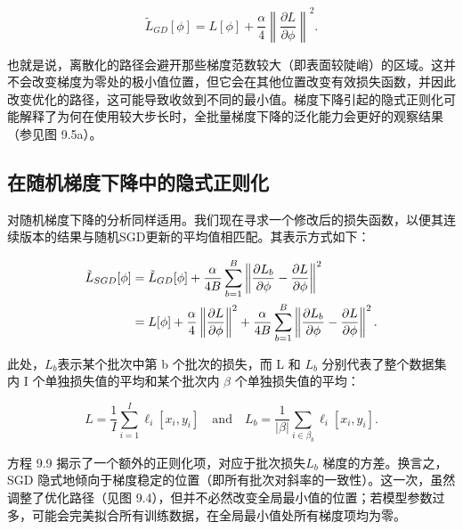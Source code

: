 \documentclass[lang=cn,newtx,10pt,scheme=chinese]{elegantbook}
\begin{document}
\begin{equation}
\tilde{L}_{GD}[\phi] = L[\phi] + \frac{\alpha}{4} \left\| \frac{\partial L}{\partial \phi} \right\|^2 . 
\end{equation}

也就是说，离散化的路径会避开那些梯度范数较大（即表面较陡峭）的区域。这并不会改变梯度为零处的极小值位置，但它会在其他位置改变有效损失函数，并因此改变优化的路径，这可能导致收敛到不同的最小值。梯度下降引起的隐式正则化可能解释了为何在使用较大步长时，全批量梯度下降的泛化能力会更好的观察结果（参见图 9.5a）。

\subsection{在随机梯度下降中的隐式正则化}
对随机梯度下降的分析同样适用。我们现在寻求一个修改后的损失函数，以便其连续版本的结果与随机SGD更新的平均值相匹配。其表示方式如下：


\begin{align}
	\tilde{L}_{SGD}[\phi] &= \tilde{L}_{GD}[\phi] + \frac{\alpha}{4B} \sum_{b=1}^{B} \left\| \frac{\partial L_b}{\partial \phi} - \frac{\partial L}{\partial \phi} \right\|^2 \notag \\
	&= L[\phi] + \frac{\alpha}{4} \left\| \frac{\partial L}{\partial \phi} \right\|^2 + \frac{\alpha}{4B} \sum_{b=1}^{B} \left\| \frac{\partial L_b}{\partial \phi} - \frac{\partial L}{\partial \phi} \right\|^2 . 
\end{align} 


此处，\(L_b\)表示某个批次中第 b 个批次的损失，而 L 和 \(L_b\) 分别代表了整个数据集内 I 个单独损失值的平均和某个批次内 \(\beta\) 个单独损失值的平均：

\begin{equation}
L = \frac{1}{I} \sum_{i=1}^{I} \ell_i[x_i, y_i] \quad \text{and} \quad L_b = \frac{1}{|\beta|} \sum_{i \in \beta_b} \ell_i[x_i, y_i]. 
\end{equation}

方程 9.9 揭示了一个额外的正则化项，对应于批次损失\(L_b\) 梯度的方差。换言之，SGD 隐式地倾向于梯度稳定的位置（即所有批次对斜率的一致性）。这一次，虽然调整了优化路径（见图 9.4），但并不必然改变全局最小值的位置；若模型参数过多，可能会完美拟合所有训练数据，在全局最小值处所有梯度项均为零。
\end{document}
